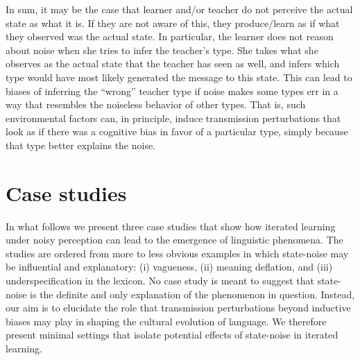 \documentclass[10pt,a4paper]{article}
\newcommand{\citeposs}[2][]{\citeauthor{#2}'s (\citeyear[#1]{#2})}
\begin{document}
In sum, it may be the case that learner and/or teacher do not perceive the actual state as what
it is. If they are not aware of this, they produce/learn as if what they observed was the
actual state. In particular, the learner does not reason about noise when she tries to infer
the teacher's type. She takes what she observes as the actual state that the teacher has seen
as well, and infers which type would have most likely generated the message to this state. This
can lead to biases of inferring the ``wrong'' teacher type if noise makes some types err in a
way that resembles the noiseless behavior of other types. That is, such environmental factors
can, in principle, induce transmission perturbations that look as if there was a cognitive bias
in favor of a particular type, simply because that type better explains the noise.


\section{Case studies}

In what follows we present three case studies that show how iterated learning under noisy
perception can lead to the emergence of linguistic phenomena. The 
studies are ordered from more to less obvious examples in which state-noise may be influential
and explanatory: (i) vagueness, (ii) meaning deflation, and (iii) underspecification in the
lexicon.
No case study is meant to suggest that state-noise is the definite and only explanation of the
phenomenon in question. Instead, our aim is to elucidate the role that transmission perturbations beyond
inductive biases may play in shaping the cultural evolution of language. We therefore present
minimal settings that isolate potential effects of state-noise in iterated learning.
\end{document}
